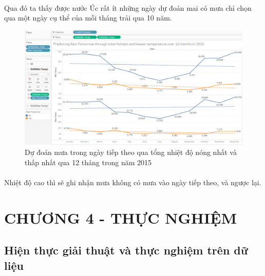 \documentclass{article}
\begin{document}
\paragraph{}Qua đó ta thấy được nước Úc rất ít những ngày dự đoán mai có mưa chỉ chọn qua một ngày cụ thể của mỗi tháng trải qua 10 năm.
\pagebreak{}
\begin{figure}[!h]
	\begin{center}
		\includegraphics[width=\linewidth]{images/tableau9.png}
		\caption{\fontsize{14}{20}\selectfont Dự đoán mưa trong ngày tiếp theo qua tổng nhiệt độ nóng nhất và thấp nhất qua 12 tháng trong năm 2015}
	\end{center}
\end{figure}
\paragraph{}Nhiệt độ cao thì sẽ ghi nhận mưa không có mưa vào ngày tiếp theo, và ngược lại.
\pagebreak{}
\section*{CHƯƠNG 4 - THỰC NGHIỆM}
\setcounter{section}{4}
\setcounter{subsection}{0}
\subsection{Hiện thực giải thuật và thực nghiệm trên dữ liệu}
\end{document}
